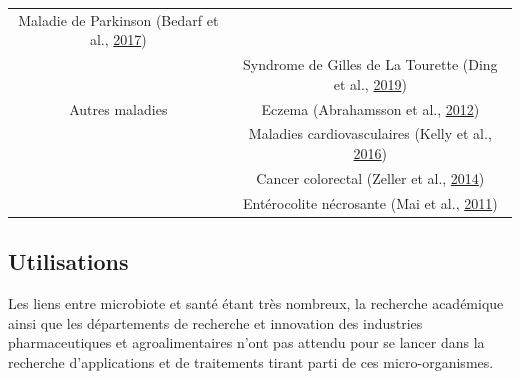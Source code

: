 \documentclass[12pt,a4paper]{reedthesis}
\theoremstyle{definition}
\theoremstyle{definition}
\theoremstyle{definition}
\theoremstyle{remark}
\begin{document}
\begin{longtable}[]{@{}cc@{}}
\begin{minipage}[t]{0.63\columnwidth}
Maladie de Parkinson (Bedarf et al., \protect\hyperlink{ref-bedarf2017functional}{2017})\strut
\end{minipage}\tabularnewline
\begin{minipage}[t]{0.31\columnwidth}\centering
\strut
\end{minipage} & \begin{minipage}[t]{0.63\columnwidth}\centering
Syndrome de Gilles de La Tourette (Ding et al., \protect\hyperlink{ref-ding2019selective}{2019})\strut
\end{minipage}\tabularnewline
\begin{minipage}[t]{0.31\columnwidth}\centering
Autres maladies\strut
\end{minipage} & \begin{minipage}[t]{0.63\columnwidth}\centering
Eczema (Abrahamsson et al., \protect\hyperlink{ref-abrahamsson2012low}{2012})\strut
\end{minipage}\tabularnewline
\begin{minipage}[t]{0.31\columnwidth}\centering
\strut
\end{minipage} & \begin{minipage}[t]{0.63\columnwidth}\centering
Maladies cardiovasculaires (Kelly et al., \protect\hyperlink{ref-kelly2016gut}{2016})\strut
\end{minipage}\tabularnewline
\begin{minipage}[t]{0.31\columnwidth}\centering
\strut
\end{minipage} & \begin{minipage}[t]{0.63\columnwidth}\centering
Cancer colorectal (Zeller et al., \protect\hyperlink{ref-zeller2014potential}{2014})\strut
\end{minipage}\tabularnewline
\begin{minipage}[t]{0.31\columnwidth}\centering
\strut
\end{minipage} & \begin{minipage}[t]{0.63\columnwidth}\centering
Entérocolite nécrosante (Mai et al., \protect\hyperlink{ref-mai2011fecal}{2011})\strut
\end{minipage}\tabularnewline
\bottomrule
\end{longtable}
\hypertarget{utilisations}{%
\subsection{Utilisations}\label{utilisations}}

Les liens entre microbiote et santé étant très nombreux, la recherche académique ainsi que les départements de recherche et innovation des industries pharmaceutiques et agroalimentaires n'ont pas attendu pour se lancer dans la recherche d'applications et de traitements tirant parti de ces micro-organismes.
\end{document}
